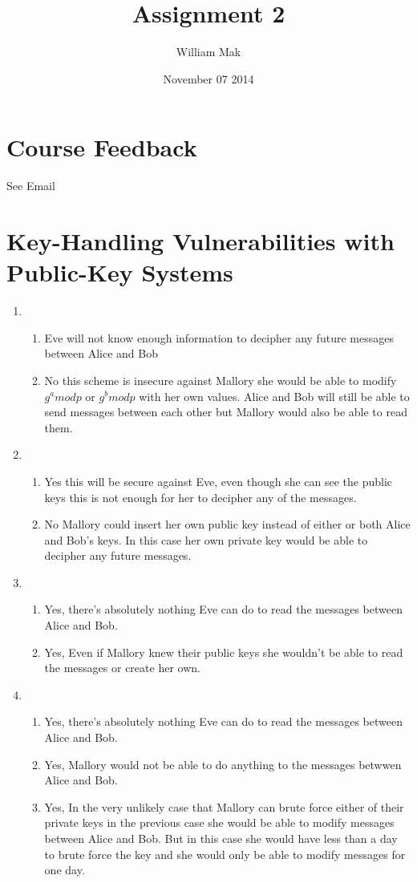 \documentclass{article}
\title{Assignment 2}
\author{William Mak}
\date{November 07 2014}
\begin{document}
\maketitle

\section{Course Feedback}
See Email
\section{Key-Handling Vulnerabilities with Public-Key Systems}
\begin{enumerate}[A]
\item
    \begin{enumerate}[i]
		\item Eve will not know enough information to decipher any future
			messages between Alice and Bob
        \item No this scheme is insecure against Mallory she would be able to
			modify $g^a mod p$ or $g^b mod p$ with her own values. Alice and Bob
			will still be able to send messages between each other but Mallory
			would also be able to read them.
    \end{enumerate}
\item
    \begin{enumerate}[i]
        \item Yes this will be secure against Eve, even though she can see the
			public keys this is not enough for her to decipher any of the
			messages.
        \item No Mallory could insert her own public key instead of either or
			both Alice and Bob's keys. In this case her own private key would be
			able to decipher any future messages.
    \end{enumerate}
\item
    \begin{enumerate}[i]
        \item Yes, there's absolutely nothing Eve can do to read the messages
			between Alice and Bob.
        \item Yes, Even if Mallory knew their public keys she wouldn't be able
			to read the messages or create her own.
    \end{enumerate}
\item
    \begin{enumerate}[i]
        \item Yes, there's absolutely nothing Eve can do to read the messages
			between Alice and Bob.
        \item Yes, Mallory would not be able to do anything to the messages
			betwwen Alice and Bob.
        \item Yes, In the very unlikely case that Mallory can brute force either
			of their private keys in the previous case she would be able to
			modify messages between Alice and Bob. But in this case she would
			have less than a day to brute force the key and she would only be
			able to modify messages for one day.
    \end{enumerate}
\end{enumerate}
\end{document}
